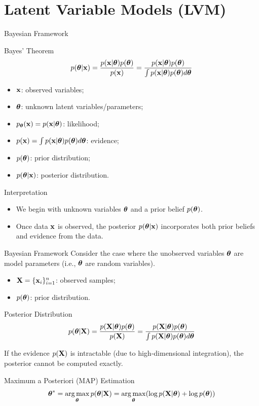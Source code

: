 \documentclass{beamer}
\begin{document}
\section{Latent Variable Models (LVM)}
\begin{frame}{Bayesian Framework}
	\begin{block}{Bayes' Theorem}
		\vspace{-0.3cm}
		\[
			p(\boldsymbol{\theta}| \mathbf{x}) = \frac{p(\mathbf{x} | \boldsymbol{\theta}) p(\boldsymbol{\theta})}{p(\mathbf{x})} = \frac{p(\mathbf{x} | \boldsymbol{\theta}) p(\boldsymbol{\theta})}{\int p(\mathbf{x} | \boldsymbol{\theta}) p(\boldsymbol{\theta}) d \boldsymbol{\theta}} 
		\]
		\vspace{-0.3cm}
		\begin{itemize}
			\item $\mathbf{x}$: observed variables; 
			\item $\boldsymbol{\theta}$: unknown latent variables/parameters;
			\item $p_{\boldsymbol{\theta}}(\mathbf{x}) = p(\mathbf{x} | \boldsymbol{\theta})$: likelihood;
			\item $p(\mathbf{x}) = \int p(\mathbf{x} | \boldsymbol{\theta}) p(\boldsymbol{\theta}) d\boldsymbol{\theta}$: evidence;
			\item $p(\boldsymbol{\theta})$: prior distribution;
			\item $p(\boldsymbol{\theta}| \mathbf{x})$: posterior distribution.
		\end{itemize}
	\end{block}
    \eqpause
	\begin{block}{Interpretation}
		\begin{itemize}
			\item We begin with unknown variables $\boldsymbol{\theta}$ and a prior belief $p(\boldsymbol{\theta})$.
			\item Once data $\mathbf{x}$ is observed, the posterior $p(\boldsymbol{\theta}| \mathbf{x})$ incorporates both prior beliefs and evidence from the data.
		\end{itemize} 
	\end{block}
\end{frame}
\begin{frame}{Bayesian Framework}
	Consider the case where the unobserved variables $\boldsymbol{\theta}$ are model parameters (i.e., $\boldsymbol{\theta}$ are random variables).
	\begin{itemize}
		\item $\mathbf{X} = \{\mathbf{x}_i\}_{i=1}^n$: observed samples;
		\item $p(\boldsymbol{\theta})$: prior distribution.
	\end{itemize}
    \eqpause
	\begin{block}{Posterior Distribution}
		\[
			p(\boldsymbol{\theta} | \mathbf{X}) = \frac{p(\mathbf{X} | \boldsymbol{\theta}) p(\boldsymbol{\theta})}{p(\mathbf{X})} = \frac{p(\mathbf{X} | \boldsymbol{\theta}) p(\boldsymbol{\theta})}{\int p(\mathbf{X} | \boldsymbol{\theta}) p(\boldsymbol{\theta}) d \boldsymbol{\theta}} 
		\]
		\vspace{-0.2cm}
	\end{block}
    \eqpause
	If the evidence $p(\mathbf{X})$ is intractable (due to high-dimensional integration), the posterior cannot be computed exactly.
    \eqpause
    \begin{block}{Maximum a Posteriori (MAP) Estimation}
	    \vspace{-0.2cm}
	    \[
	        \boldsymbol{\theta}^* = \operatorname*{arg\,max}_{\boldsymbol{\theta}} p(\boldsymbol{\theta} | \mathbf{X}) = \operatorname*{arg\,max}_{\boldsymbol{\theta}} (\log p(\mathbf{X} | \boldsymbol{\theta}) + \log p(\boldsymbol{\theta}))
	    \]
    \end{block}
\end{frame}
\end{document}

